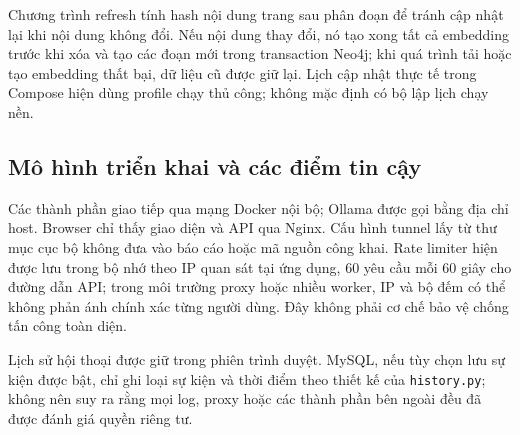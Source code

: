 Chương trình refresh tính hash nội dung trang sau phân đoạn để tránh cập nhật lại khi nội dung không đổi. Nếu nội dung thay đổi, nó tạo xong tất cả embedding trước khi xóa và tạo các đoạn mới trong transaction Neo4j; khi quá trình tải hoặc tạo embedding thất bại, dữ liệu cũ được giữ lại. Lịch cập nhật thực tế trong Compose hiện dùng profile chạy thủ công; không mặc định có bộ lập lịch chạy nền.
\subsection{Mô hình triển khai và các điểm tin cậy}
Các thành phần giao tiếp qua mạng Docker nội bộ; Ollama được gọi bằng địa chỉ host. Browser chỉ thấy giao diện và API qua Nginx. Cấu hình tunnel lấy từ thư mục cục bộ không đưa vào báo cáo hoặc mã nguồn công khai. Rate limiter hiện được lưu trong bộ nhớ theo IP quan sát tại ứng dụng, 60 yêu cầu mỗi 60 giây cho đường dẫn API; trong môi trường proxy hoặc nhiều worker, IP và bộ đếm có thể không phản ánh chính xác từng người dùng. Đây không phải cơ chế bảo vệ chống tấn công toàn diện.

Lịch sử hội thoại được giữ trong phiên trình duyệt. MySQL, nếu tùy chọn lưu sự kiện được bật, chỉ ghi loại sự kiện và thời điểm theo thiết kế của \texttt{history.py}; không nên suy ra rằng mọi log, proxy hoặc các thành phần bên ngoài đều đã được đánh giá quyền riêng tư.
